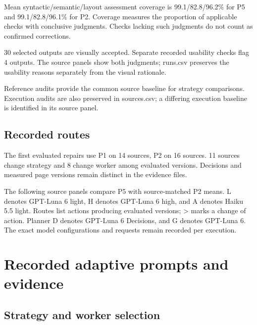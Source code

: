 \documentclass[acmsmall,screen,nonacm]{acmart}
\begin{document}
Mean syntactic/semantic/layout assessment coverage is 99.1/82.8/96.2\% for P5 and 99.1/82.8/96.1\% for P2. Coverage measures the proportion of applicable checks with conclusive judgments. Checks lacking such judgments do not count as confirmed corrections.

30 selected outputs are visually accepted. Separate recorded usability checks flag 4 outputs. The source panels show both judgments; runs.csv preserves the usability reasons separately from the visual rationale.

Reference audits provide the common source baseline for strategy comparisons. Execution audits are also preserved in sources.csv; a differing execution baseline is identified in its source panel.

\subsection{Recorded routes}

The first evaluated repairs use P1 on 14 sources, P2 on 16 sources. 11 sources change strategy and 8 change worker among evaluated versions. Decisions and measured page versions remain distinct in the evidence files.

The following source panels compare P5 with source-matched P2 means. L denotes GPT-Luna 6 light, H denotes GPT-Luna 6 high, and A denotes Haiku 5.5 light. Routes list actions producing evaluated versions; > marks a change of action. Planner D denotes GPT-Luna 6 Decisions, and G denotes GPT-Luna 6. The exact model configurations and requests remain recorded per execution.

\clearpage
\section{Recorded adaptive prompts and evidence}

\subsection{Strategy and worker selection}
\end{document}
